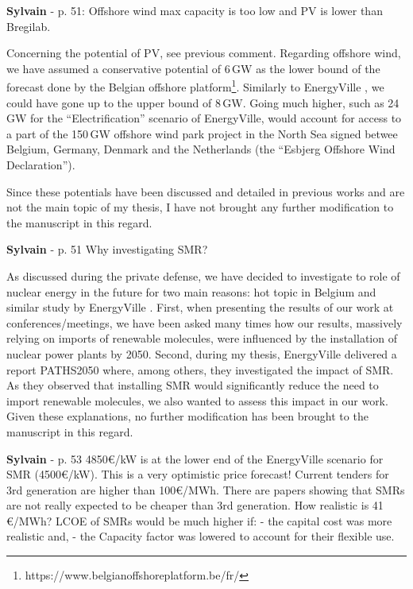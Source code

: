 \documentclass[12pt,a4paper]{article}
\begin{document}
\begin{mdframed}[style=comment] %
{\color{purple} \textbf{Sylvain}} - p. 51: Offshore wind max capacity is too low and PV is lower than Bregilab.
\end{mdframed}

\noindent Concerning the potential of PV, see previous comment. Regarding offshore wind, we have assumed a conservative potential of 6\,GW as the lower bound of the forecast done by the Belgian offshore platform\footnote{https://www.belgianoffshoreplatform.be/fr/}. Similarly to EnergyVille \cite{PATHS2050}, we could have gone up to the upper bound of 8\,GW. Going much higher, such as 24\,GW for the ``Electrification'' scenario of EnergyVille, would account for access to a part of the 150\,GW offshore wind park project in the North Sea signed betwee Belgium, Germany, Denmark and the Netherlands (the ``Esbjerg Offshore Wind Declaration''). 

\noindent Since these potentials have been discussed and detailed in previous works and are not the main topic of my thesis, I have not brought any further modification to the manuscript in this regard.

\begin{mdframed}[style=comment] %
{\color{purple} \textbf{Sylvain}} - p. 51 Why investigating SMR?
\end{mdframed}

\noindent As discussed during the private defense, we have decided to investigate to role of nuclear energy in the future for two main reasons: hot topic in Belgium and similar study by EnergyVille \cite{PATHS2050}. First, when presenting the results of our work at conferences/meetings, we have been asked many times how our results, massively relying on imports of renewable molecules, were influenced by the installation of nuclear power plants by 2050. Second, during my thesis, EnergyVille delivered a report PATHS2050 where, among others, they investigated the impact of SMR. As they observed that installing SMR would significantly reduce the need to import renewable molecules, we also wanted to assess this impact in our work. Given these explanations, no further modification has been brought to the manuscript in this regard.

\begin{mdframed}[style=comment] %
{\color{purple} \textbf{Sylvain}} - p. 53 4850€/kW is at the lower end of the EnergyVille scenario for SMR (4500€/kW). This is a very optimistic price forecast! Current tenders for 3rd generation are higher than 100€/MWh. There are papers showing that SMRs are not really expected to be cheaper than 3rd generation. How realistic is 41 €/MWh? LCOE of SMRs would be much higher if: - the capital cost was more realistic and, - the Capacity factor was lowered to account for their flexible use.
\end{mdframed}
\end{document}
